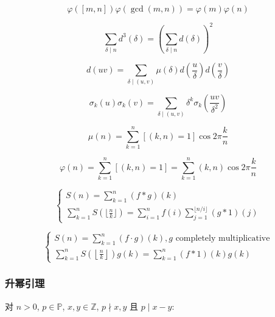 \begin{equation}
    \varphi([m, n])\varphi(\gcd(m,n)) = \varphi(m)\varphi(n)
\end{equation}

\begin{equation}
    \sum_{\delta\mid n}d^3(\delta) = \left(\sum_{\delta\mid n}d(\delta)\right)^2
\end{equation}

\begin{equation}
    d(uv) = \sum_{\delta\mid (u, v)}\mu(\delta)d\left(\frac{u}{\delta}\right)d\left(\frac{v}{\delta}\right)
\end{equation}

\begin{equation}
    \sigma_k(u)\sigma_k(v) = \sum_{\delta\mid (u, v)}\delta^k\sigma_k(\frac{uv}{\delta^2})
\end{equation}

\begin{equation}
    \mu(n) = \sum_{k=1}^n[(k, n)=1]\cos{2\pi \frac{k}{n}}
\end{equation}

\begin{equation}
    \varphi(n) = \sum_{k=1}^n[(k, n)=1] = \sum_{k=1}^n(k, n)\cos{2\pi \frac{k}{n}}
\end{equation}

\begin{equation}
    \begin{cases}
        S(n) = \sum_{k=1}^n(f * g)(k) \\
        \sum_{k=1}^nS(\lfloor \frac n k \rfloor) = \sum_{i=1}^nf(i)\sum_{j=1}^{\lfloor n/i \rfloor}(g * 1)(j)
    \end{cases}
\end{equation}

\begin{equation}
    \begin{cases}
        S(n) = \sum_{k=1}^n(f \cdot g)(k), g \text{ completely multiplicative} \\
        \sum_{k=1}^nS\left(\left\lfloor \frac n k \right\rfloor\right)g(k) = \sum_{k=1}^n(f * 1)(k)g(k)
    \end{cases}
\end{equation}

\subsubsection{升幂引理}

对 \(n>0\), \(p\in\mathbb{P}\), \(x,y\in\mathbb{Z}\), \(p\nmid x,y\) 且 \(p\mid x-y\):

